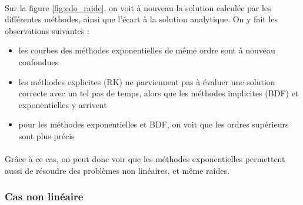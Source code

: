     \paragraph{}
    Sur la figure \ref{fig:edo_raide}, on voit à nouveau la solution calculée par les différentes méthodes, ainsi que l'écart à la solution analytique. On y fait les observations suivantes :
    \begin{itemize}
        \item les courbes des méthodes exponentielles de même ordre sont à nouveau confondues
        \item les méthodes explicites (RK) ne parviennent pas à évaluer une solution correcte avec un tel pas de temps, alors que les méthodes implicites (BDF) et exponentielles y arrivent
        \item pour les méthodes exponentielles et BDF, on voit que les ordres supérieurs sont plus précis
    \end{itemize}
    \paragraph{}
    Grâce à ce cas, on peut donc voir que les méthodes exponentielles permettent aussi de résoudre des problèmes non linéaires, et même raides.

    
    \subsubsection{Cas non linéaire}

